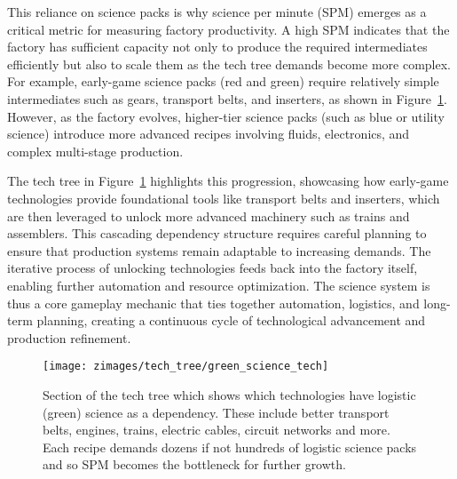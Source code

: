 This reliance on science packs is why science per minute (SPM) emerges as a critical metric for measuring factory productivity. A high SPM indicates that the factory has sufficient capacity not only to produce the required intermediates efficiently but also to scale them as the tech tree demands become more complex. For example, early-game science packs (red and green) require relatively simple intermediates such as gears, transport belts, and inserters, as shown in Figure~\ref{fig:green_science_tech}. However, as the factory evolves, higher-tier science packs (such as blue or utility science) introduce more advanced recipes involving fluids, electronics, and complex multi-stage production.

The tech tree in Figure~\ref{fig:green_science_tech} highlights this progression, showcasing how early-game technologies provide foundational tools like transport belts and inserters, which are then leveraged to unlock more advanced machinery such as trains and assemblers. This cascading dependency structure requires careful planning to ensure that production systems remain adaptable to increasing demands. The iterative process of unlocking technologies feeds back into the factory itself, enabling further automation and resource optimization. The science system is thus a core gameplay mechanic that ties together automation, logistics, and long-term planning, creating a continuous cycle of technological advancement and production refinement.

\begin{figure}[ht]
    \centering
    \texttt{[image: zimages/tech\_tree/green\_science\_tech]}
    \caption{Section of the tech tree which shows which technologies have logistic (green) science as a dependency. These include better transport belts, engines, trains, electric cables, circuit networks and more. Each recipe demands dozens if not hundreds of logistic science packs and so SPM becomes the bottleneck for further growth.}
    \label{fig:green_science_tech}
\end{figure}




